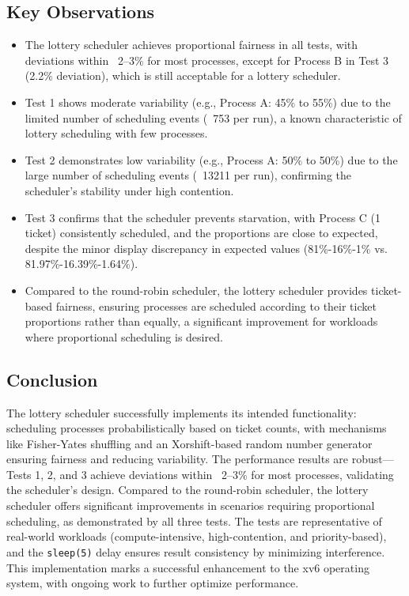 \documentclass{article}
\begin{document}
\subsection{Key Observations}
\begin{itemize}
    \item The lottery scheduler achieves proportional fairness in all tests, with deviations within ~2–3\% for most processes, except for Process B in Test 3 (2.2\% deviation), which is still acceptable for a lottery scheduler.
    \item Test 1 shows moderate variability (e.g., Process A: 45\% to 55\%) due to the limited number of scheduling events (~753 per run), a known characteristic of lottery scheduling with few processes.
    \item Test 2 demonstrates low variability (e.g., Process A: 50\% to 50\%) due to the large number of scheduling events (~13211 per run), confirming the scheduler’s stability under high contention.
    \item Test 3 confirms that the scheduler prevents starvation, with Process C (1 ticket) consistently scheduled, and the proportions are close to expected, despite the minor display discrepancy in expected values (81\%-16\%-1\% vs. 81.97\%-16.39\%-1.64\%).
    \item Compared to the round-robin scheduler, the lottery scheduler provides ticket-based fairness, ensuring processes are scheduled according to their ticket proportions rather than equally, a significant improvement for workloads where proportional scheduling is desired.
\end{itemize}

\subsection{Conclusion}
The lottery scheduler successfully implements its intended functionality: scheduling processes probabilistically based on ticket counts, with mechanisms like Fisher-Yates shuffling and an Xorshift-based random number generator ensuring fairness and reducing variability. The performance results are robust—Tests 1, 2, and 3 achieve deviations within ~2–3\% for most processes, validating the scheduler’s design. Compared to the round-robin scheduler, the lottery scheduler offers significant improvements in scenarios requiring proportional scheduling, as demonstrated by all three tests. The tests are representative of real-world workloads (compute-intensive, high-contention, and priority-based), and the \texttt{sleep(5)} delay ensures result consistency by minimizing interference. This implementation marks a successful enhancement to the xv6 operating system, with ongoing work to further optimize performance.
\end{document}
